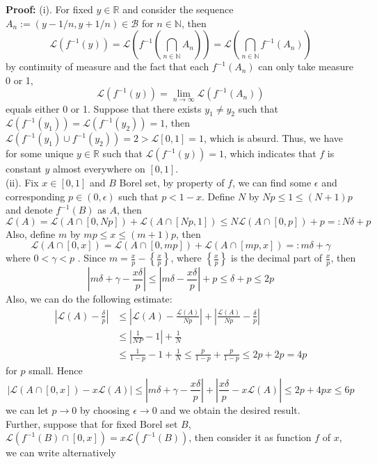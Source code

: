 \documentclass[12pt]{article}
\begin{document}
\textbf{Proof:} (i). For fixed $y\in\mathbb{R}$ and consider the sequence $A_n:=(y-1/n,y+1/n)\in\mathcal{B}$ for $n\in\mathbb{N}$, then 
$$
    \mathcal{L}\left(f^{-1}(y)\right)=\mathcal{L}\left(f^{-1}\left(\bigcap_{n\in\mathbb{N}}A_n\right)\right)=\mathcal{L}\left(\bigcap_{n\in\mathbb{N}}f^{-1}(A_n)\right)
$$
by continuity of measure and the fact that each $f^{-1}(A_n)$ can only take measure 0 or 1, 
$$
\mathcal{L}(f^{-1}(y))=\lim\limits_{n\to\infty}\mathcal{L}(f^{-1}(A_n))
$$ 
equals either 0 or 1. Suppose that there exists $y_1\neq y_2$ such that $\mathcal{L}(f^{-1}(y_1))=\mathcal{L}(f^{-1}(y_2))=1$, then $\mathcal{L}(f^{-1}(y_1)\cup f^{-1}(y_2))=2>\mathcal{L}[0,1]=1$, which is absurd. Thus, we have for some unique $y\in\mathbb{R}$ such that $\mathcal{L}(f^{-1}(y))=1$, which indicates that $f$ is constant $y$ almost everywhere on $[0,1]$. \\
\indent (ii). Fix $x\in[0,1]$ and $B$ Borel set, by property of $f$, we can find some $\epsilon$ and corresponding $p\in(0,\epsilon)$ such that $p<1-x$. Define $N$ by $Np\leq 1\leq (N+1)p$ and denote $f^{-1}(B)$ as $A$, then 
$$
    \mathcal{L}(A)=\mathcal{L}(A\cap [0,Np])+\mathcal{L}(A\cap [Np,1])\leq N\mathcal{L}(A\cap [0,p])+p=: N\delta+p
$$
Also, define $m$ by $mp\leq x\leq (m+1)p$, then 
$$
    \mathcal{L}(A\cap[0,x])=\mathcal{L}(A\cap[0,mp])+\mathcal{L}(A\cap [mp, x])=: m\delta+\gamma
$$
where $0<\gamma<p$ . Since $m=\frac{x}{p}-\left\{\frac{x}{p}\right\}$, where $\left\{\frac{x}{p}\right\}$ is the decimal part of $\frac{x}{p}$, then 
$$
    \left|m\delta+\gamma -\frac{x\delta}{p}\right|\leq \left|m\delta-\frac{x\delta}{p}\right|+p\leq \delta+p\leq 2p
$$
Also, we can do the following estimate:
\begin{align*}
    \left|\mathcal{L}(A)-\frac{\delta}{p}\right|&\leq\left|\mathcal{L}(A)-\frac{\mathcal{L}(A)}{Np}\right|+\left|\frac{\mathcal{L}(A)}{Np}-\frac{\delta}{p}\right| \\
    &\leq \left|\frac{1}{NP}-1\right|+\frac{1}{N} \\
    &\leq \frac{1}{1-p}-1+\frac{1}{N}\leq\frac{p}{1-p}+\frac{p}{1-p}\leq 2p+2p=4p
\end{align*} 
for $p$ small. Hence 
$$
    \left|\mathcal{L}(A\cap[0,x])-x\mathcal{L}(A)\right|\leq\left|m\delta+\gamma-\frac{x\delta}{p}\right|+\left|\frac{x\delta}{p}-x\mathcal{L}(A)\right|\leq 2p+4px\leq 6p
$$
we can let $p\to 0$ by choosing $\epsilon\to 0$ and we obtain the desired result. \\
\indent Further, suppose that for fixed Borel set $B$, $\mathcal{L}(f^{-1}(B)\cap [0,x])=x\mathcal{L}(f^{-1}(B))$, then consider it as function $f$ of $x$, we can write alternatively
\end{document}

